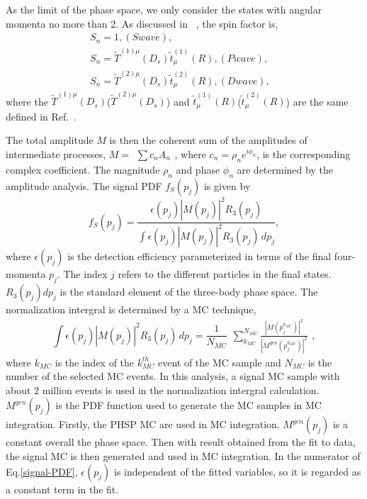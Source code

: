 {    As the limit of the phase space, we only consider the states with angular momenta no more than 2. As discussed in ~\cite{Doc-DB-613-v16}, the spin factor is, 
    \begin{equation}
        \begin{array}{lr}
            S_{n} = 1,           (S wave), &\\
            S_{n} = \tilde{T}^{(1)\mu}(D_{s})\tilde{t}^{(1)}_{\mu}(R),          (P wave), &\\
            S_{n} = \tilde{T}^{(2)\mu}(D_{s})\tilde{t}^{(2)}_{\mu}(R),          (D wave), &
        \end{array}\label{spin-factor} 
    \end{equation}
    where the $\tilde{T}^{(1)\mu}(D_{s})$($\tilde{T}^{(2)\mu}(D_{s})$) and $\tilde{t}^{(1)}_{\mu}(R)$($\tilde{t}^{(2)}_{\mu}(R)$) are the same defined in Ref.~\cite{covariant-tensors}.

The total amplitude $M$ is then the coherent sum of the amplitudes of intermediate processes, $M=\begin{matrix}\sum c_{n}A_{n}\end{matrix}$, where $c_{n}=\rho_{n}e^{i\phi_{n}}$, is the corresponding complex coefficient. The magnitude $\rho_{n}$ and phase $\phi_{n}$ are determined by the amplitude analysis. 
    The signal PDF $f_{S}(p_{j})$ is given by 
    \begin{equation}
        f_{S}(p_{j}) = \frac{\epsilon(p_{j})\left|M(p_{j})\right|^{2}R_{3}(p_{j})}{\int \epsilon(p_{j})\left|M(p_{j})\right|^{2}R_{3}(p_{j})\,dp_{j}}, \label{signal-PDF}
    \end{equation}
    where $\epsilon(p_{j})$ is the detection efficiency parameterized in terms of the final four-momenta $p_{j}$. The index $j$ refers to the different particles in the final states. $R_{3}(p_{j})dp_{j}$ is the standard element of the three-body phase space. The normalization intergral is determined by a MC technique,
    \begin{equation}
    \int \epsilon(p_{j})\left|M(p_{j})\right|^{2}R_{3}(p_{j})\,dp_{j}= \frac{1}{N_{MC}} \begin{matrix}\sum_{k_{MC}}^{N_{MC}} \frac{\left|M(p_{j}^{k_{MC}})\right|^{2}}{\left|M^{gen}(p_{j}^{k_{MC}})\right|^{2}}\end{matrix}, \label{MC-intergral}
    \end{equation}
    where $k_{MC}$ is the index of the $k_{MC}^{th}$ event of the MC sample and $N_{MC}$ is the number of the selected MC events. In this analysis, a signal MC sample with about 2 million events is used in the normalization intergral calculation. $M^{gen}(p_{j})$ is the PDF function used to generate the MC samples in MC integration.
    Firstly, the PHSP MC are used in MC integration. $M^{gen}(p_{j})$ is a constant overall the phase space. Then with result obtained from the fit to data, the signal MC is then generated and used in MC integration. In the numerator of Eq.\ref{signal-PDF}, $\epsilon(p_{j})$ is independent of the fitted variables, so it is regarded as a constant term in the fit.

}
